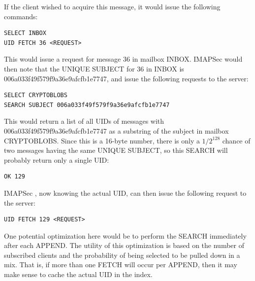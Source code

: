 \documentclass[pageno]{jpaper}
\newcommand{\project}{IMAPSec }
\begin{document}
If the client wished to acquire this message, it would issue the following commands:

\begin{lstlisting}
SELECT INBOX
UID FETCH 36 <REQUEST>
\end{lstlisting}

This would issue a request for message 36 in mailbox INBOX. \project would then note that
the UNIQUE SUBJECT for 36 in INBOX is 006a033f49f579f9a36e9afcfb1e7747, and issue the following requests to the server:

\begin{lstlisting}
SELECT CRYPTOBLOBS
SEARCH SUBJECT 006a033f49f579f9a36e9afcfb1e7747
\end{lstlisting}

This would return a list of all UIDs of messages with 006a033f49f579f9a36e9afcfb1e7747 as a substring of the subject in mailbox CRYPTOBLOBS. Since this is a 16-byte number, there is only a $1/2^{128}$ chance of two messages having the same UNIQUE SUBJECT, so this SEARCH will probably return only a single UID:

\begin{lstlisting}
OK 129
\end{lstlisting}


\project, now knowing the actual UID, can then issue the following request to the server:

\begin{lstlisting}
UID FETCH 129 <REQUEST>
\end{lstlisting}

One potential optimization here would be to perform the SEARCH immediately after each APPEND. The utility of this optimization is based on the number of subscribed clients and the probability of being selected to be pulled down in a mix. That is, if more than one FETCH will occur per APPEND, then it may make sense to cache the actual UID in the index.

\label{processing}
\end{document}
